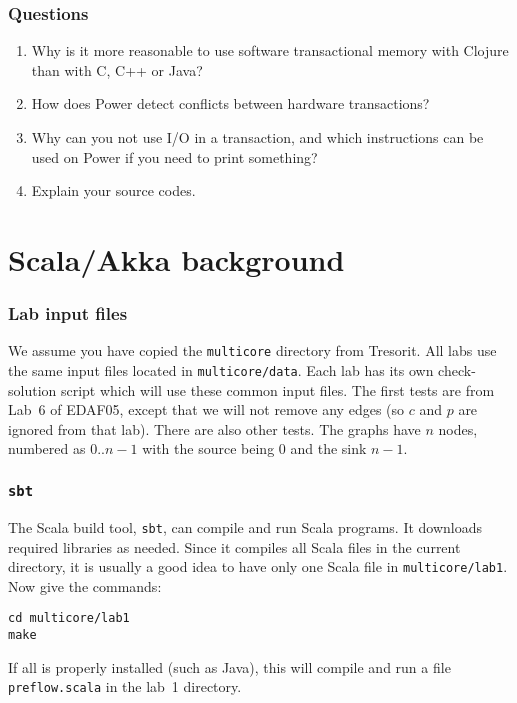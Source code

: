 \documentclass{forsete}
\begin{document}
\subsubsection*{Questions}
\begin{enumerate}
\item Why is it more reasonable to use software transactional memory with
Clojure than with C, C++ or Java?
\item How does Power detect conflicts between hardware transactions?
\item Why can you not use I/O in a transaction, and which instructions can be used on Power if
you need to print something?
\item Explain your source codes.
\end{enumerate}

\newpage
\section{Scala/Akka background}

\subsubsection*{Lab input files}
We assume you have copied the {\tt multicore} directory from Tresorit.
All labs use the same input files located in {\tt multicore/data}.
Each lab has its own check-solution script which will use these common
input files. The first tests are from Lab~6 of EDAF05, except that we will not
remove any edges (so $c$ and $p$ are ignored from that lab). There are also other tests.
The graphs have $n$ nodes, numbered as $0..n-1$ with the source being $0$ and
the sink $n-1$.

\subsubsection*{{\tt sbt}}
The Scala build tool, {\tt sbt}, can compile and run Scala programs. It downloads required libraries as needed.
Since it compiles all Scala files in the current directory, it is usually a good idea to have only one Scala file
in {\tt multicore/lab1}.
Now give the commands:
\begin{verbatim}
cd multicore/lab1
make
\end{verbatim}
If all is properly installed (such as Java), this will compile and run a file {\tt preflow.scala} in the
lab~1 directory.
\end{document}
